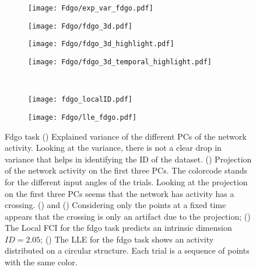 \documentclass[11pt,a4paper]{article}
\begin{document}
\begin{figure}
 \centering
 \begin{subfigure}[b]{0.20\textwidth}
   \centering
   \texttt{[image: Fdgo/exp\_var\_fdgo.pdf]}
  \subcaption{}\label{fig:Fdgo:exp_var_fdgo}
 \end{subfigure}
 \begin{subfigure}[b]{0.23\textwidth}
   \centering
   \texttt{[image: Fdgo/fdgo\_3d.pdf]}
  \subcaption{}\label{fig:Fdgo:fdgo_3d}
 \end{subfigure}
 \begin{subfigure}[b]{0.18\textwidth}
   \centering
   \texttt{[image: Fdgo/fdgo\_3d\_highlight.pdf]}
  \subcaption{}\label{fig:Fdgo:fdgo_3d_highlight}
 \end{subfigure}
 \begin{subfigure}[b]{0.35\textwidth}
   \centering
   \texttt{[image: Fdgo/fdgo\_3d\_temporal\_highlight.pdf]}
  \subcaption{}\label{fig:Fdgo:fdgo_3d_temporal}
 \end{subfigure}\\
  \begin{subfigure}[b]{0.45\textwidth}
    \centering
    \texttt{[image: fdgo\_localID.pdf]}
  \subcaption{}\label{fig:Fdgo:hist2D_fdgo_localFCI}
  \end{subfigure}
 \begin{subfigure}[b]{0.45\textwidth}
    \centering
    \texttt{[image: Fdgo/lle\_fdgo.pdf]}
  \subcaption{}\label{fig:Fdgo:lle_2d_fdgo}
  \end{subfigure}
 \caption{Fdgo task
() Explained variance of the different PCs of the network activity.
Looking at the variance, there is not a clear drop in variance that helps in identifying the ID of the dataset.
() Projection of the network activity on the first three PCs. The colorcode stands for the different input angles of the trials.
Looking at the projection on the first three PCs seems that the network has activity has a crossing.
() and () Considering only the points at a fixed time appears that the crossing is only an artifact due to the projection;
() The Local FCI for the fdgo task predicts an intrinsic dimension $ID=2.05$;
() The LLE for the fdgo task shows an activity distributed on a circular structure.
 Each trial is a sequence of points with the same color.
 }\label{fig:Fdgo}
\end{figure}
\end{document}
